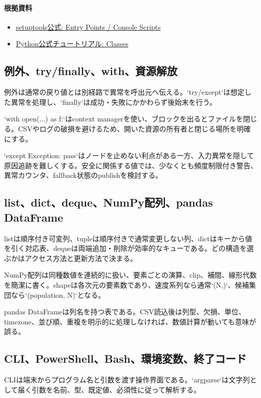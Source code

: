 \documentclass[a4paper,11pt]{article}
\begin{document}
\paragraph{根拠資料}
\begin{itemize}[leftmargin=1.6em]
\item \href{https://setuptools.pypa.io/en/latest/userguide/entry_point.html}{setuptools公式: Entry Points / Console Scripts}
\item \href{https://docs.python.org/3/tutorial/classes.html}{Python公式チュートリアル: Classes}
\end{itemize}

\subsection{例外、try/finally、with、資源解放}
例外は通常の戻り値とは別経路で異常を呼出元へ伝える。`try/except`は想定した異常を処理し、`finally`は成功・失敗にかかわらず後始末を行う。


`with open(...) as f:`はcontext managerを使い、ブロックを出るとファイルを閉じる。CSVやログの破損を避けるため、開いた資源の所有者と閉じる場所を明確にする。


`except Exception: pass`はノードを止めない利点がある一方、入力異常を隠して原因追跡を難しくする。安全に関係する値では、少なくとも頻度制限付き警告、異常カウンタ、fallback状態のpublishを検討する。



\subsection{list、dict、deque、NumPy配列、pandas DataFrame}
listは順序付き可変列、tupleは順序付きで通常変更しない列、dictはキーから値を引く対応表、dequeは両端追加・削除が効率的なキューである。どの構造を選ぶかはアクセス方法と更新方法で決まる。


NumPy配列は同種数値を連続的に扱い、要素ごとの演算、clip、補間、線形代数を簡潔に書く。shapeは各次元の要素数であり、速度系列なら通常`(N,)`、候補集団なら`(population, N)`となる。


pandas DataFrameは列名を持つ表である。CSV読込後は列型、欠損、単位、timezone、並び順、重複を明示的に処理しなければ、数値計算が動いても意味が誤る。



\subsection{CLI、PowerShell、Bash、環境変数、終了コード}
CLIは端末からプログラム名と引数を渡す操作界面である。`argparse`は文字列として届く引数を名前、型、既定値、必須性に従って解析する。
\end{document}
